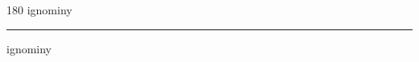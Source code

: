 
\begin{frame}
\begin{center}
\begin{turn}{180}
{\fontsize{2.5cm}{1em}\selectfont ignominy}
\end{turn}
\vspace{1em}\par  
\hrule
\vspace{1em}\par  
{\fontsize{2.5cm}{1em}\selectfont ignominy}
\end{center}
\end{frame}
